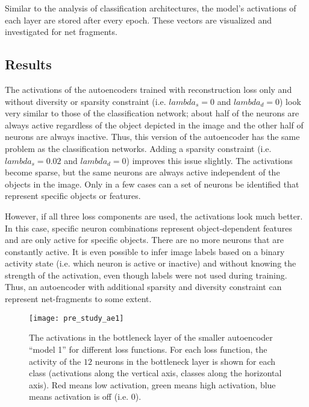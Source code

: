 Similar to the analysis of classification architectures, the model's activations of each layer are stored after every epoch.
These vectors are visualized and investigated for net fragments.

\subsection{Results}
The activations of the autoencoders trained with reconstruction loss only and without diversity or sparsity constraint (i.e. $lambda_s = 0$ and $lambda_d = 0$) look very similar to those of the classification network; about half of the neurons are always active regardless of the object depicted in the image and the other half of neurons are always inactive. Thus, this version of the autoencoder has the same problem as the classification networks. Adding a sparsity constraint (i.e. $lambda_s = 0.02$ and $lambda_d = 0$) improves this issue slightly. The activations become sparse, but the same neurons are always active independent of the objects in the image. Only in a few cases can a set of neurons be identified that represent specific objects or features.

However, if all three loss components are used, the activations look much better. In this case, specific neuron combinations represent object-dependent features and are only active for specific objects. There are no more neurons that are constantly active. It is even possible to infer image labels based on a binary activity state (i.e. which neuron is active or inactive) and without knowing the strength of the activation, even though labels were not used during training. Thus, an autoencoder with additional sparsity and diversity constraint can represent net-fragments to some extent.


\begin{figure}[h]
    \centering
    \texttt{[image: pre\_study\_ae1]}
    \caption[Network activations of the smaller autoencoder network on the straight line dataset]{The activations in the bottleneck layer of the smaller autoencoder ``model 1'' for different loss functions. For each loss function, the activity of the $12$ neurons in the bottleneck layer is shown for each class (activations along the vertical axis, classes along the horizontal axis). Red means low activation, green means high activation, blue means activation is off (i.e. $0$).}
\end{figure}


